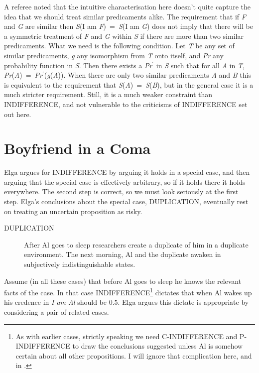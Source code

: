 A referee noted that the intuitive characterisation here doesn't quite capture the idea that we should treat similar predicaments alike. The requirement that if \textit{F} and \textit{G} are similar then \textit{S}(I am \textit{F})~=~\textit{S}(I am \textit{G}) does not imply that there will be a symmetric treatment of \textit{F} and \textit{G} within \textit{S} if there are more than two similar predicaments. What we need is the following condition. Let \textit{T} be any set of similar predicaments, \textit{g} any isomorphism from \textit{T} onto itself, and \textit{Pr} any probability function in \textit{S}. Then there exists a \textit{Pr}\(^\prime\) in \textit{S} such that for all \textit{A} in \textit{T}, \textit{Pr}(\textit{A})~=~\textit{Pr}\(^\prime\)(\textit{g}(\textit{A})). When there are only two similar predicaments \textit{A} and \textit{B} this is equivalent to the requirement that \textit{S}(\textit{A})~=~\textit{S}(\textit{B}), but in the general case it is a much stricter requirement. Still, it is a much weaker constraint than INDIFFERENCE, and not vulnerable to the criticisms of INDIFFERENCE set out here.

\section{Boyfriend in a Coma}

Elga argues for INDIFFERENCE by arguing it holds in a special case, and then arguing that the special case is effectively arbitrary, so if it holds there it holds everywhere. The second step is correct, so we must look seriously at the first step. Elga's conclusions about the special case, DUPLICATION, eventually rest on treating an uncertain proposition as risky.

\begin{description}
\item[DUPLICATION] After Al goes to sleep researchers create a duplicate of him in a duplicate environment. The next morning, Al and the duplicate awaken in subjectively indistinguishable states.
\end{description}

\noindent Assume (in all these cases) that before Al goes to sleep he knows the relevant facts of the case. In that case INDIFFERENCE\footnote{As with earlier cases, strictly speaking we need C\nobreakdash-INDIFFERENCE and P\nobreakdash-INDIFFERENCE to draw the conclusions suggested unless Al is somehow certain about all other propositions. I will ignore that complication here, and in .} dictates that when Al wakes up his credence in \textit{I am Al} should be 0.5. Elga argues this dictate is appropriate by considering a pair of related cases.

